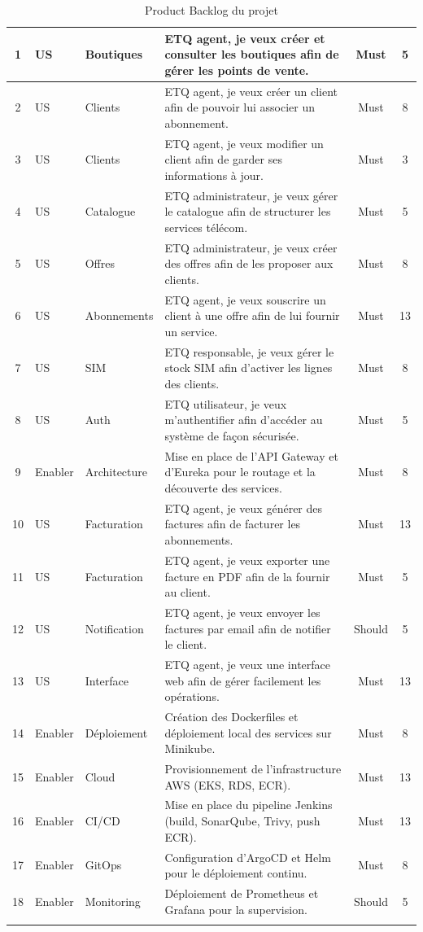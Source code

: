 \begin{longtable}{|c|p{2cm}|p{2.2cm}|p{6.8cm}|c|c|}
    1 & US & Boutiques & ETQ agent, je veux créer et consulter les boutiques afin de gérer les points de vente. & Must & 5 \\
    \hline
    2 & US & Clients & ETQ agent, je veux créer un client afin de pouvoir lui associer un abonnement. & Must & 8 \\
    \hline
    3 & US & Clients & ETQ agent, je veux modifier un client afin de garder ses informations à jour. & Must & 3 \\
    \hline
    4 & US & Catalogue & ETQ administrateur, je veux gérer le catalogue afin de structurer les services télécom. & Must & 5 \\
    \hline
    5 & US & Offres & ETQ administrateur, je veux créer des offres afin de les proposer aux clients. & Must & 8 \\
    \hline
    6 & US & Abonnements & ETQ agent, je veux souscrire un client à une offre afin de lui fournir un service. & Must & 13 \\
    \hline
    7 & US & SIM & ETQ responsable, je veux gérer le stock SIM afin d'activer les lignes des clients. & Must & 8 \\
    \hline
    8 & US & Auth & ETQ utilisateur, je veux m'authentifier afin d'accéder au système de façon sécurisée. & Must & 5 \\
    \hline
    9 & Enabler & Architecture & Mise en place de l'API Gateway et d'Eureka pour le routage et la découverte des services. & Must & 8 \\
    \hline
    10 & US & Facturation & ETQ agent, je veux générer des factures afin de facturer les abonnements. & Must & 13 \\
    \hline
    11 & US & Facturation & ETQ agent, je veux exporter une facture en PDF afin de la fournir au client. & Must & 5 \\
    \hline
    12 & US & Notification & ETQ agent, je veux envoyer les factures par email afin de notifier le client. & Should & 5 \\
    \hline
    13 & US & Interface & ETQ agent, je veux une interface web afin de gérer facilement les opérations. & Must & 13 \\
    \hline
    14 & Enabler & Déploiement & Création des Dockerfiles et déploiement local des services sur Minikube. & Must & 8 \\
    \hline
    15 & Enabler & Cloud & Provisionnement de l'infrastructure AWS (EKS, RDS, ECR). & Must & 13 \\
    \hline
    16 & Enabler & CI/CD & Mise en place du pipeline Jenkins (build, SonarQube, Trivy, push ECR). & Must & 13 \\
    \hline
    17 & Enabler & GitOps & Configuration d'ArgoCD et Helm pour le déploiement continu. & Must & 8 \\
    \hline
    18 & Enabler & Monitoring & Déploiement de Prometheus et Grafana pour la supervision. & Should & 5 \\
    \hline
    
    \caption{Product Backlog du projet}
    \label{tab:backlog}
\end{longtable}

